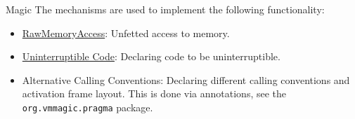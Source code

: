 \begin{section}{Magic}
The mechanisms are used to implement the following functionality:
\begin{itemize}
  \item \hyperref[sec:rawmemoryaccess]{RawMemoryAccess}: Unfetted access to memory.
  \item \hyperref[sec:uninterruptiblecode]{Uninterruptible Code}: Declaring code to be uninterruptible.
  \item Alternative Calling Conventions: Declaring different calling conventions and activation frame layout. This is done via annotations, see the \texttt{org.vm\-ma\-gic.prag\-ma} package.
\end{itemize}

\end{section}
